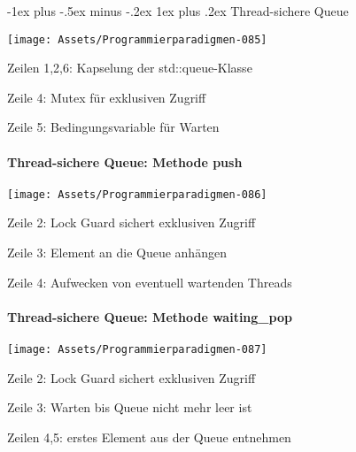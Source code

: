 \documentclass[10pt]{article}
\makeatletter
\renewcommand{\subsubsection}{\@startsection{subsubsection}{3}{0mm}%
                                {-1ex plus -.5ex minus -.2ex}%
                                {1ex plus .2ex}%
                                {\normalfont\small\bfseries}}
\makeatother
\begin{document}
\subsubsection{Thread-sichere Queue}
\begin{center}
  \texttt{[image: Assets/Programmierparadigmen-085]}
\end{center}
\begin{itemize*}
  \item Zeilen 1,2,6: Kapselung der std::queue-Klasse
  \item Zeile 4: Mutex für exklusiven Zugriff
  \item Zeile 5: Bedingungsvariable für Warten
\end{itemize*}

\paragraph{Thread-sichere Queue: Methode push}
\begin{center}
  \texttt{[image: Assets/Programmierparadigmen-086]}
\end{center}
\begin{itemize*}
  \item Zeile 2: Lock Guard sichert exklusiven Zugriff
  \item Zeile 3: Element an die Queue anhängen
  \item Zeile 4: Aufwecken von eventuell wartenden Threads
\end{itemize*}

\paragraph{Thread-sichere Queue: Methode waiting\_pop}
\begin{center}
  \texttt{[image: Assets/Programmierparadigmen-087]}
\end{center}
\begin{itemize*}
  \item Zeile 2: Lock Guard sichert exklusiven Zugriff
  \item Zeile 3: Warten bis Queue nicht mehr leer ist
  \item Zeilen 4,5: erstes Element aus der Queue entnehmen
\end{itemize*}
\end{document}
